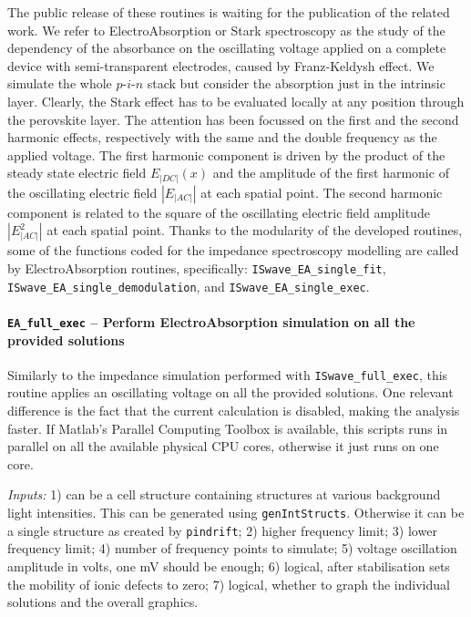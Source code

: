 		The public release of these routines is waiting for the publication of the related work.
		We refer to ElectroAbsorption or Stark spectroscopy as the study of the dependency of the absorbance on the oscillating voltage applied on a complete device with semi\hyp{}transparent electrodes, caused by Franz\hyp{}Keldysh effect.
		We simulate the whole $p$-$i$-$n$ stack but consider the absorption just in the intrinsic layer.
		Clearly, the Stark effect has to be evaluated locally at any position through the perovskite layer.
		The attention has been focussed on the first and the second harmonic effects, respectively with the same and the double frequency as the applied voltage.
		The first harmonic component is driven by the product of the steady state electric field $E_|DC|(x)$ and the amplitude of the first harmonic of the oscillating electric field $|E_|AC||$ at each spatial point.
		The second harmonic component is related to the square of the oscillating electric field amplitude $|E_|AC|^2|$ at each spatial point.
		Thanks to the modularity of the developed routines, some of the functions coded for the impedance spectroscopy modelling are called by ElectroAbsorption routines, specifically: \texttt{IS\-wave\_EA\_single\_fit}, \texttt{IS\-wave\_EA\_single\_demodulation}, and \texttt{IS\-wave\_EA\_single\_exec}.



		\paragraph{\texttt{EA\_full\_exec} -- Perform ElectroAbsorption simulation on all the provided solutions}
		Similarly to the impedance simulation performed with \texttt{IS\-wave\_full\_exec}, this routine applies an oscillating voltage on all the provided solutions.
		One relevant difference is the fact that the current calculation is disabled, making the analysis faster.
		If Matlab's Parallel Computing Toolbox is available, this scripts runs in parallel on all the available physical CPU cores, otherwise it just runs on one core.

		\textit{Inputs:} 1) can be a cell structure containing structures at various background
		light intensities. This can be generated using \texttt{gen\-Int\-Structs}.
		Otherwise it can be a single structure as created by \texttt{pin\-drift};
		2) higher frequency limit;
		3) lower frequency limit;
		4) number of frequency points to simulate;
		5) voltage oscillation amplitude in volts, one mV should be enough;
		6) logical, after stabilisation sets the mobility of
		ionic defects to zero;
		7) logical, whether to graph the individual solutions and
		the overall graphics.


